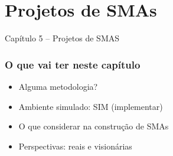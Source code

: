 


\section{Projetos de SMAs}

\begin{frame}

\begin{center}
{\huge Capítulo 5 -- Projetos de SMAS}
\end{center}

\end{frame}


\begin{frame} %


\frametitle{O que vai ter neste capítulo}

\begin{itemize}
  \item Alguma metodologia?
  \item Ambiente simulado: SIM (implementar)
  
  \item O que considerar na construção de SMAs
  \item Perspectivas: reais e visionárias
\end{itemize}


\end{frame}


